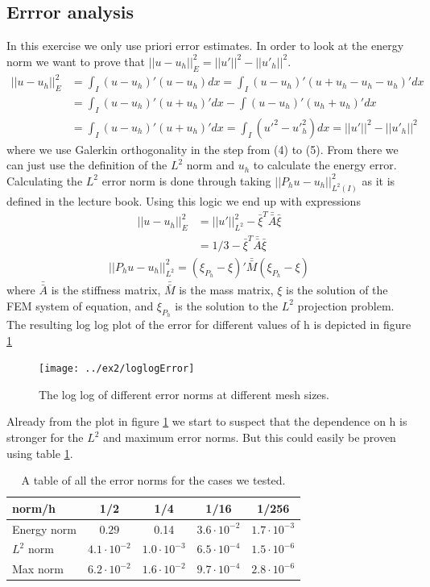 \documentclass[11pt]{article}
\begin{document}
\subsection{Errror analysis}
In this exercise we only use priori error estimates. In order to look at the energy norm we want to prove that $||u - u_h||^2_E = ||u'||^2 - ||{u'}_h||^2$. 
\begin{align}
	||u-u_h||^2_E &= \int_I (u-u_h)'(u-u_h)dx = \int_I (u-u_h)'(u+u_h-u_h-u_h)'dx \\
	&= \int_I (u-u_h)'(u+u_h)'dx -  \int(u-u_h)'(u_h+u_h)'dx \\
	&= \int_I (u-u_h)'(u+u_h)'dx = \int_I ({u'}^2 - {u'}^2_h)dx =  ||u'||^2 - ||{u'}_h||^2 
\end{align}
where we use Galerkin orthogonality in the step from (4) to (5). From there we can just use the definition of the $L^2$ norm and $u_h$ to calculate the energy error. Calculating the $L^2$ error norm is done through taking $||P_hu - u_h||^2_{L^2(I)}$ as it is defined in the lecture book. Using this logic we end up with expressions
\begin{align}
	||u - u_h||^2_E &= ||u'||^2_{L^2} - \bar{\xi}^T \bar{\bar{A}} \bar{\xi} \\
	&= 1/3 - \bar{\xi}^T \bar{\bar{A}} \bar{\xi}
\end{align}
\begin{align}
	||P_hu - u_h||^2_{L^2} = (\xi_{P_h} - \xi)' \bar{\bar{M}} (\xi_{P_h} - \xi)
\end{align}
where $\bar{\bar{A}}$ is the stiffness matrix, $\bar{\bar{M}}$ is the mass matrix, $\xi$ is the solution of the FEM system of equation, and $\xi_{P_h}$ is the solution to the $L^2$ projection problem.  The resulting log log plot of the error for different values of h is depicted in figure \ref{fig:loglogError}
\begin{figure}[H]
	\centering
	\texttt{[image: ../ex2/loglogError]}
	\caption{The log log of different error norms at different mesh sizes.}
	\label{fig:loglogError}
\end{figure}
Already from the plot in figure \ref{fig:loglogError} we start to suspect that the dependence on h is stronger for the $L^2$ and maximum error norms. But this could easily be proven using table \ref{table:errors}. 
\begin{table}[H]
	\center
	\begin{tabular}{l | c c c c}
		norm/h & 1/2 & 1/4 & 1/16 & 1/256 \\
		\hline 
		Energy norm & $ 0.29$ & 0.14 & $3.6\cdot10^{-2}$ & $1.7\cdot10^{-3}$ \\
		$L^2$ norm & $4.1\cdot10^{-2}$ & $1.0\cdot10^{-3}$ & $6.5\cdot10^{-4}$ & $1.5\cdot10^{-6}$ \\
		Max norm & $6.2\cdot10^{-2}$ & $1.6\cdot10^{-2}$ & $9.7\cdot 10^{-4}$ & $2.8\cdot10^{-6}$
	\end{tabular}
	\caption{A table of all the error norms for the cases we tested.}
	\label{table:errors}
\end{table}
\end{document}
